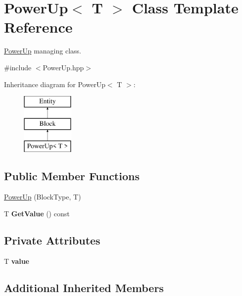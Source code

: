 \hypertarget{class_power_up}{}\section{Power\+Up$<$ T $>$ Class Template Reference}
\label{class_power_up}


\mbox{\hyperlink{class_power_up}{Power\+Up}} managing class.  




{\ttfamily \#include $<$Power\+Up.\+hpp$>$}

Inheritance diagram for Power\+Up$<$ T $>$\+:\begin{figure}[H]
\begin{center}
\leavevmode
\includegraphics[height=3.000000cm]{class_power_up}
\end{center}
\end{figure}
\subsection*{Public Member Functions}
\begin{DoxyCompactItemize}
\item 
\mbox{\hyperlink{class_power_up_a03f89f8ff81c7c7753d6df1907e668f2}{Power\+Up}} (Block\+Type, T)
\item 
\mbox{\label{class_power_up_a8981a14b7f18dc1f08ab07c318a24d0b}} 
T {\bfseries Get\+Value} () const
\end{DoxyCompactItemize}
\subsection*{Private Attributes}
\begin{DoxyCompactItemize}
\item 
\mbox{\label{class_power_up_a09cf850b3abd0f7062553599ffcd0dc8}} 
T {\bfseries value}
\end{DoxyCompactItemize}
\subsection*{Additional Inherited Members}


